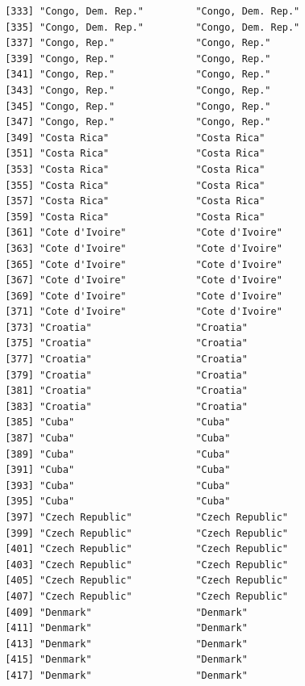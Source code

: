 \documentclass[
  letterpaper,
  DIV=11,
  numbers=noendperiod]{scrreprt}
\begin{document}
\begin{verbatim}
 [333] "Congo, Dem. Rep."         "Congo, Dem. Rep."        
 [335] "Congo, Dem. Rep."         "Congo, Dem. Rep."        
 [337] "Congo, Rep."              "Congo, Rep."             
 [339] "Congo, Rep."              "Congo, Rep."             
 [341] "Congo, Rep."              "Congo, Rep."             
 [343] "Congo, Rep."              "Congo, Rep."             
 [345] "Congo, Rep."              "Congo, Rep."             
 [347] "Congo, Rep."              "Congo, Rep."             
 [349] "Costa Rica"               "Costa Rica"              
 [351] "Costa Rica"               "Costa Rica"              
 [353] "Costa Rica"               "Costa Rica"              
 [355] "Costa Rica"               "Costa Rica"              
 [357] "Costa Rica"               "Costa Rica"              
 [359] "Costa Rica"               "Costa Rica"              
 [361] "Cote d'Ivoire"            "Cote d'Ivoire"           
 [363] "Cote d'Ivoire"            "Cote d'Ivoire"           
 [365] "Cote d'Ivoire"            "Cote d'Ivoire"           
 [367] "Cote d'Ivoire"            "Cote d'Ivoire"           
 [369] "Cote d'Ivoire"            "Cote d'Ivoire"           
 [371] "Cote d'Ivoire"            "Cote d'Ivoire"           
 [373] "Croatia"                  "Croatia"                 
 [375] "Croatia"                  "Croatia"                 
 [377] "Croatia"                  "Croatia"                 
 [379] "Croatia"                  "Croatia"                 
 [381] "Croatia"                  "Croatia"                 
 [383] "Croatia"                  "Croatia"                 
 [385] "Cuba"                     "Cuba"                    
 [387] "Cuba"                     "Cuba"                    
 [389] "Cuba"                     "Cuba"                    
 [391] "Cuba"                     "Cuba"                    
 [393] "Cuba"                     "Cuba"                    
 [395] "Cuba"                     "Cuba"                    
 [397] "Czech Republic"           "Czech Republic"          
 [399] "Czech Republic"           "Czech Republic"          
 [401] "Czech Republic"           "Czech Republic"          
 [403] "Czech Republic"           "Czech Republic"          
 [405] "Czech Republic"           "Czech Republic"          
 [407] "Czech Republic"           "Czech Republic"          
 [409] "Denmark"                  "Denmark"                 
 [411] "Denmark"                  "Denmark"                 
 [413] "Denmark"                  "Denmark"                 
 [415] "Denmark"                  "Denmark"                 
 [417] "Denmark"                  "Denmark"                 

\end{verbatim}
\end{document}
